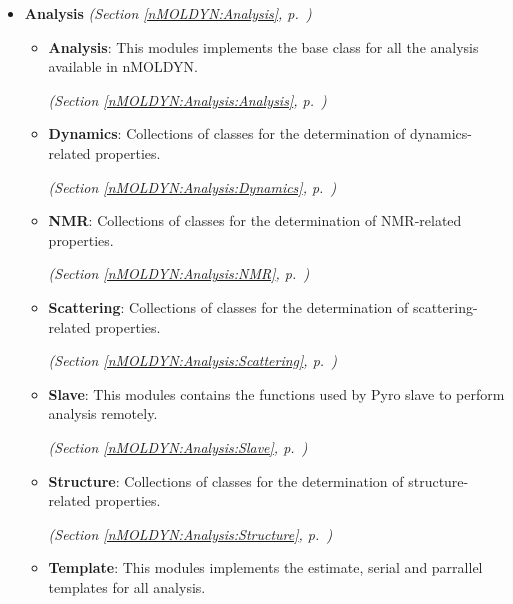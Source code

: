 \begin{itemize}
\setlength{\parskip}{0ex}
\item \textbf{Analysis}
  \textit{(Section \ref{nMOLDYN:Analysis}, p.~\pageref{nMOLDYN:Analysis})}

  \begin{itemize}
\setlength{\parskip}{0ex}
    \item \textbf{Analysis}: This modules implements the base class for all the analysis available in 
nMOLDYN.



  \textit{(Section \ref{nMOLDYN:Analysis:Analysis}, p.~\pageref{nMOLDYN:Analysis:Analysis})}

    \item \textbf{Dynamics}: Collections of classes for the determination of dynamics-related properties.



  \textit{(Section \ref{nMOLDYN:Analysis:Dynamics}, p.~\pageref{nMOLDYN:Analysis:Dynamics})}

    \item \textbf{NMR}: Collections of classes for the determination of NMR-related properties.



  \textit{(Section \ref{nMOLDYN:Analysis:NMR}, p.~\pageref{nMOLDYN:Analysis:NMR})}

    \item \textbf{Scattering}: Collections of classes for the determination of scattering-related properties.



  \textit{(Section \ref{nMOLDYN:Analysis:Scattering}, p.~\pageref{nMOLDYN:Analysis:Scattering})}

    \item \textbf{Slave}: This modules contains the functions used by Pyro slave to perform analysis remotely.



  \textit{(Section \ref{nMOLDYN:Analysis:Slave}, p.~\pageref{nMOLDYN:Analysis:Slave})}

    \item \textbf{Structure}: Collections of classes for the determination of structure-related properties.



  \textit{(Section \ref{nMOLDYN:Analysis:Structure}, p.~\pageref{nMOLDYN:Analysis:Structure})}

    \item \textbf{Template}: This modules implements the estimate, serial and parrallel templates for 
all analysis.




\end{itemize}
\end{itemize}
